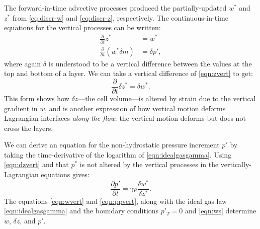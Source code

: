 \documentclass[10pt,letterpaper,margin=1in]{memoir}
\begin{document}
The forward-in-time advective processes produced the partially-updated $w^*$ and $z^*$ from \eqref{eq:discr-w} and \eqref{eq:discr-z}, respectively. The continuous-in-time equations for the vertical processes can be written:
\begin{subequations}
\begin{align}
\frac{\partial}{\partial t} z^* &=w^* \label{eqn:zvert} \\
\frac{\partial}{\partial t} \left ( w^* \delta m \right ) &= \delta p' \label{eqn:wvert},
\end{align}
\end{subequations}
where again $\delta$ is understood to be a vertical difference between the values at the top and bottom of a layer.
We can take a vertical difference of \eqref{eqn:zvert}  to get:
\begin{equation}
\frac{\partial}{\partial t} \delta z^* = \delta w^* \label{eqn:dzvert}.
\end{equation}
This form shows how $\delta z$---the cell volume---is altered by strain due to the vertical gradient in $w$, and is another expression of how vertical motion deforms Lagrangian interfaces \textit{along the flow}: the vertical motion deforms but does not cross the layers. 

We can derive an equation for the non-hydrostatic pressure increment $p'$ by taking the time-derivative of the logarithm of \eqref{eqn:idealgasgamma}. Using \eqref{eqn:dzvert} and that $p^*$ is not altered by the vertical processes in the vertically-Lagrangian equations gives:
\begin{equation}
\frac{\partial p'}{\partial t} = \gamma p \frac{\delta w^*}{\delta z^*} \label{eqn:ppvert}.
\end{equation}
The equations \eqref{eqn:wvert} and \eqref{eqn:ppvert}, along with the ideal gas law \eqref{eqn:idealgasgamma} and the boundary conditions $p'_T = 0$ and  \eqref{eqn:ws} determine $w$, $\delta z$, and $p'$.


\end{document}
